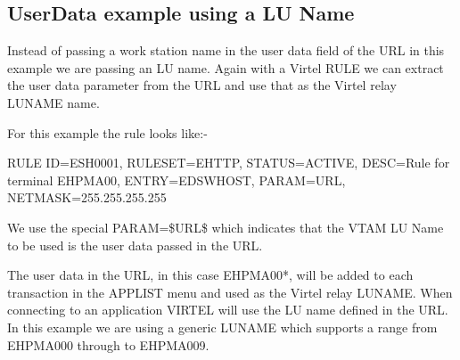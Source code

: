\documentclass[letterpaper,10pt,english]{sphinxmanual}
\begin{document}
\subsection{UserData example using a LU Name}
\label{\detokenize{connectivity_guide:userdata-example-using-a-lu-name}}\label{\detokenize{connectivity_guide:index-151}}
Instead of passing a work station name in the user data field of the URL in this example we are passing an LU name. Again with a Virtel RULE we can extract the user data parameter from the URL and use that as the Virtel relay LUNAME name.


For this example the rule looks like:-

\begin{sphinxVerbatim}[commandchars=\\\{\}]
RULE ID=ESH0001,
RULESET=E\PYGZhy{}HTTP,
STATUS=ACTIVE,
DESC=\PYGZsq{}Rule for terminal EHPMA00\PYGZsq{},
ENTRY=EDSWHOST,
PARAM=\PYGZdl{}URL\PYGZdl{},
NETMASK=255.255.255.255
\end{sphinxVerbatim}

We use the special PARAM=\$URL\$ which indicates that the VTAM LU Name to be used is the user data passed in the URL.



The user data in the URL, in this case EHPMA00*, will be added to each transaction in the APPLIST menu and used as the Virtel relay LUNAME. When connecting to an application VIRTEL will use the LU name defined in the URL. In this example we are using a generic LUNAME which supports a range from EHPMA000 through to EHPMA009.

\ignorespaces 
\end{document}
